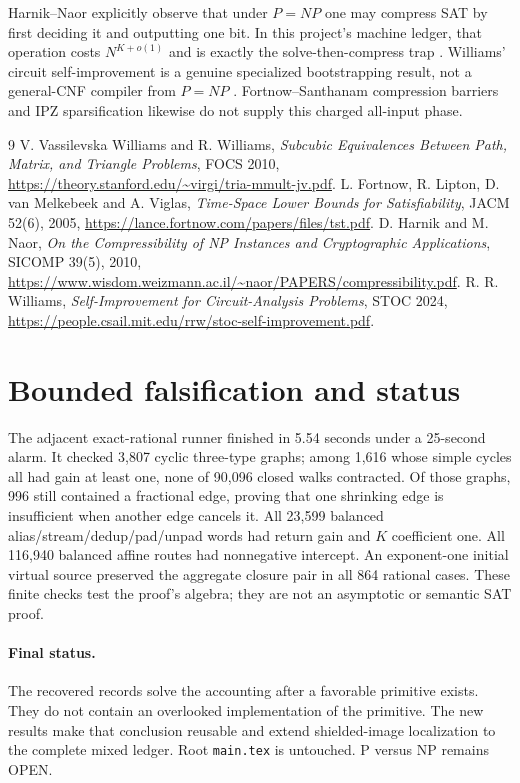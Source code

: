\documentclass[11pt]{article}
\begin{document}
Harnik--Naor explicitly observe that under $P=NP$ one may compress SAT by
first deciding it and outputting one bit.  In this project's machine ledger,
that operation costs $N^{K+o(1)}$ and is exactly the solve-then-compress trap
\cite{hn}.  Williams' circuit self-improvement is a genuine specialized
bootstrapping result, not a general-CNF compiler from $P=NP$ \cite{rw}.
Fortnow--Santhanam compression barriers and IPZ sparsification likewise do
not supply this charged all-input phase.

\begin{thebibliography}{9}
 V. Vassilevska Williams and R. Williams,
\emph{Subcubic Equivalences Between Path, Matrix, and Triangle Problems},
FOCS 2010, \url{https://theory.stanford.edu/~virgi/tria-mmult-jv.pdf}.
 L. Fortnow, R. Lipton, D. van Melkebeek and A. Viglas,
\emph{Time-Space Lower Bounds for Satisfiability}, JACM 52(6), 2005,
\url{https://lance.fortnow.com/papers/files/tst.pdf}.
 D. Harnik and M. Naor,
\emph{On the Compressibility of NP Instances and Cryptographic Applications},
SICOMP 39(5), 2010,
\url{https://www.wisdom.weizmann.ac.il/~naor/PAPERS/compressibility.pdf}.
 R. R. Williams,
\emph{Self-Improvement for Circuit-Analysis Problems}, STOC 2024,
\url{https://people.csail.mit.edu/rrw/stoc-self-improvement.pdf}.
\end{thebibliography}

\section{Bounded falsification and status}

The adjacent exact-rational runner finished in 5.54 seconds under a
25-second alarm.  It checked 3,807 cyclic three-type graphs; among 1,616 whose
simple cycles all had gain at least one, none of 90,096 closed walks
contracted.  Of those graphs, 996 still contained a fractional edge, proving
that one shrinking edge is insufficient when another edge cancels it.  All
23,599 balanced alias/stream/dedup/pad/unpad words had return gain and
$K$ coefficient one.  All 116,940 balanced affine routes had nonnegative
intercept.  An exponent-one initial virtual source preserved the aggregate
closure pair in all 864 rational cases.  These finite checks test the proof's
algebra; they are not an asymptotic or semantic SAT proof.

\paragraph{Final status.}
The recovered records solve the accounting after a favorable primitive
exists.  They do not contain an overlooked implementation of the primitive.
The new results make that conclusion reusable and extend shielded-image
localization to the complete mixed ledger.  Root \texttt{main.tex} is
untouched.  P versus NP remains OPEN.
\end{document}
